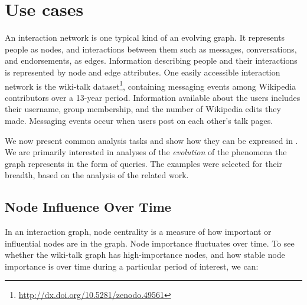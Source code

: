 \section{Use cases}
\label{sec:usecases}


An interaction network is one typical kind of an evolving graph.  It
represents people as nodes, and interactions between them such as
messages, conversations, and endorsements, as edges.  Information
describing people and their interactions is represented by node and
edge attributes.  One easily accessible interaction network is the
wiki-talk
dataset\footnote{\url{http://dx.doi.org/10.5281/zenodo.49561}},
containing messaging events among Wikipedia contributors over a
13-year period.  Information available about the users includes their
username, group membership, and the number of Wikipedia edits they
made.  Messaging events occur when users post on each other's talk
pages.

We now present common analysis tasks and show how they can be
expressed in \tga. We are primarily interested in analyses of the {\em
  evolution} of the phenomena the graph represents in the form of
queries.  The examples were selected for their
breadth, based on the analysis of the related work.

\subsection{Node Influence Over Time}

In an interaction graph, node centrality is a measure of how important
or influential nodes are in the graph.  Node importance
fluctuates over time.  To see whether the wiki-talk graph has
high-importance nodes, and how stable node importance is over
time during a particular period of interest, we can:

